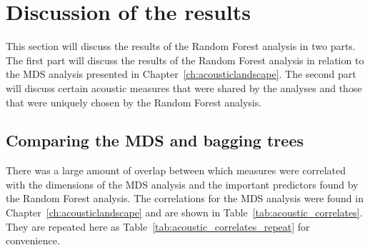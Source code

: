 \section{Discussion of the results} \label{sec:dt_discussion}

This section will discuss the results of the Random Forest analysis in two parts. The first part will discuss the results of the Random Forest analysis in relation to the MDS analysis presented in Chapter~\ref{ch:acousticlandscape}. The second part will discuss certain acoustic measures that were shared by the analyses and those that were uniquely chosen by the Random Forest analysis. 
\subsection{Comparing the MDS and bagging trees} \label{sec:dt_mds}
There was a large amount of overlap between which measures were correlated with the dimensions of the MDS analysis and the important predictors found by the Random Forest analysis. The correlations for the MDS analysis were found in Chapter~\ref{ch:acousticlandscape} and are shown in Table~\ref{tab:acoustic_correlates}. They are repeated here as Table~\ref{tab:acoustic_correlates_repeat} for convenience.  

